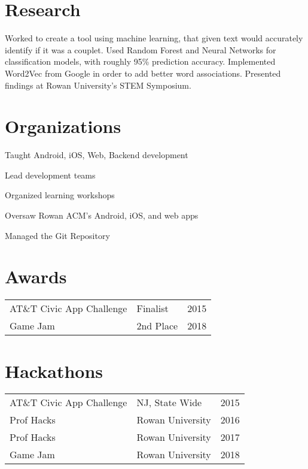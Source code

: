 \documentclass[]{johns_resume_style}
\begin{document}
\begin{minipage}[t]{0.68\textwidth}

\section{Research}
\justify \unskip\parfillskip 0pt \par Worked to create a tool using machine learning, that  given text would accurately identify if it was a couplet. Used Random Forest and Neural Networks for classification models, with roughly 95\% prediction accuracy. Implemented Word2Vec from Google in order to add better word associations. Presented findings at Rowan University's STEM Symposium.
\sectionsep

\section{Organizations} 
\noindent{}
\begin{tightemize}
    \item Taught Android, iOS, Web, Backend development
    \item Lead development teams
    \item Organized learning workshops
    \item Oversaw Rowan ACM's Android, iOS, and web apps
    \item Managed the Git Repository
\end{tightemize}
\sectionsep





\section{Awards} 
\begin{tabular}{p{5cm}p{5cm}p{5cm}}
 AT\&T Civic App Challenge	     & Finalist        & 2015 \\
Game Jam         & 2nd Place    & 2018
\end{tabular}
\sectionsep

\section{Hackathons} 


\begin{tabular}{p{5cm}p{5cm}p{5cm}}
AT\&T Civic App Challenge  & NJ, State Wide  &   2015 \\  
Prof Hacks	     & Rowan University  & 2016\\
Prof Hacks	     & Rowan University  & 2017\\
Game Jam         & Rowan University  & 2018

 
\end{tabular}
\sectionsep


\end{minipage} 
\end{document}
